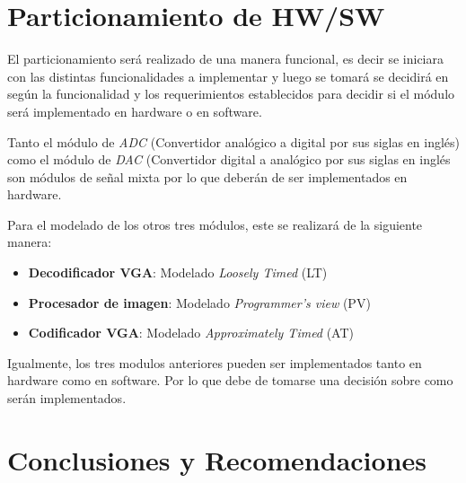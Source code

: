 \documentclass[10pt, letterpaper, conference]{IEEEtran}
\begin{document}
\section{Particionamiento de HW/SW}
\label{sec:partitioning}

El particionamiento ser\'a realizado de una manera funcional, es decir
se iniciara con las distintas funcionalidades a implementar y luego se
tomar\'a se decidir\'a en seg\'un la funcionalidad y los
requerimientos establecidos para decidir si el m\'odulo ser\'a
implementado en hardware o en software.

Tanto el m\'odulo de \emph{ADC} (Convertidor anal\'ogico a digital por
sus siglas en ingl\'es) como el m\'odulo de \emph{DAC} (Convertidor
digital a anal\'ogico por sus siglas en ingl\'es son m\'odulos de
señal mixta por lo que deber\'an de ser implementados en hardware.

Para el modelado de los otros tres m\'odulos, este se realizar\'a de la siguiente manera:

\begin{itemize}
    \item \textbf{Decodificador VGA}: Modelado \emph{Loosely Timed} (LT)
    \item \textbf{Procesador de imagen}: Modelado \emph{Programmer's view} (PV)
    \item \textbf{Codificador VGA}: Modelado \emph{Approximately Timed} (AT)
\end{itemize}

Igualmente, los tres modulos anteriores pueden ser implementados tanto
en hardware como en software. Por lo que debe de tomarse una
decisi\'on sobre como ser\'an implementados. %

%

\section{Conclusiones y Recomendaciones}





 

\end{document}
